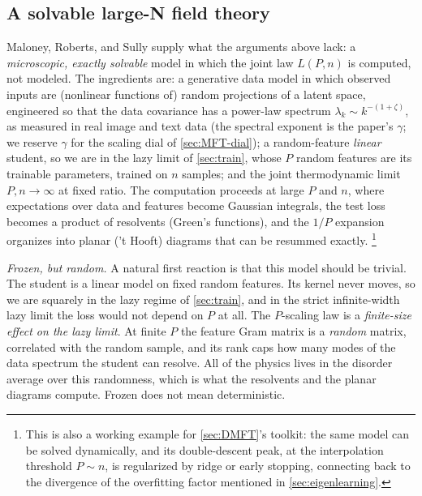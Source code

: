 \documentclass[11pt]{article}
\begin{document}
\subsection{A solvable large-N field theory}
\label{sec:MRS}

Maloney, Roberts, and Sully \cite{maloney2022solvable} supply what the arguments above lack: a \emph{microscopic, exactly solvable} model in which the joint law $L(P,n)$ is computed, not modeled. The ingredients are: a generative data model in which observed inputs are (nonlinear functions of) random projections of a latent space, engineered so that the data covariance has a power-law spectrum $\lambda_k \sim k^{-(1+\zeta)}$, as measured in real image and text data (the spectral exponent is the paper's $\gamma$; we reserve $\gamma$ for the scaling dial of \cref{sec:MFT-dial}); a random-feature \emph{linear} student, so we are in the lazy limit of \cref{sec:train}, whose $P$ random features are its trainable parameters, trained on $n$ samples; and the joint thermodynamic limit $P,n\to\infty$ at fixed ratio. The computation proceeds at large $P$ and $n$, where expectations over data and features become Gaussian integrals, the test loss becomes a product of resolvents (Green's functions), and the $1/P$ expansion organizes into planar ('t Hooft) diagrams that can be resummed exactly.%
%
\footnote{This is also a working example for \cref{sec:DMFT}'s toolkit: the same model can be solved dynamically, and its double-descent peak, at the interpolation threshold $P\sim n$, is regularized by ridge or early stopping, connecting back to the divergence of the overfitting factor mentioned in \cref{sec:eigenlearning}.}

\emph{Frozen, but random.} A natural first reaction is that this model should be trivial. The student is a linear model on fixed random features. Its kernel never moves, so we are squarely in the lazy regime of \cref{sec:train}, and in the strict infinite-width lazy limit the loss would not depend on $P$ at all. The $P$-scaling law is a \emph{finite-size effect on the lazy limit}. At finite $P$ the feature Gram matrix is a \emph{random} matrix, correlated with the random sample, and its rank caps how many modes of the data spectrum the student can resolve. All of the physics lives in the disorder average over this randomness, which is what the resolvents and the planar diagrams compute. Frozen does not mean deterministic.
\end{document}
